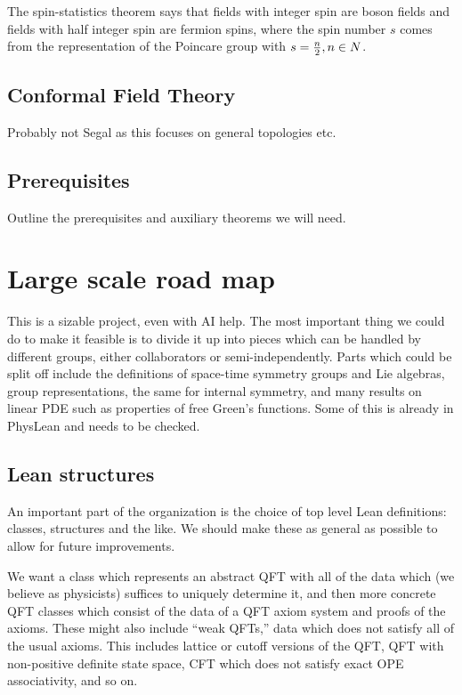 \documentclass{article}
\newcommand{\1}{\mathbbm{1}}
\theoremstyle{plain}
\theoremstyle{definition}
\numberwithin{equation}{section}
\begin{document}
The spin-statistics theorem says that fields with integer spin are boson fields and fields with half integer spin are fermion spins, where the spin number $s$ comes from the representation of the Poincare group with $s= {n \over 2}, n \in N$. 


\subsection{Conformal Field Theory}

Probably not Segal as this focuses on general topologies etc. 


\subsection{Prerequisites}
Outline the prerequisites and auxiliary theorems we will need.

\section{Large scale road map}

This is a sizable project, even with AI help.
The most important thing we could do to make it feasible is to divide it up into pieces
which can be handled by different groups, either collaborators or semi-independently.
Parts which could be split off include the definitions of space-time symmetry groups and Lie algebras,
group representations, the same for internal symmetry, and many results on linear PDE such as
properties of free Green's functions.  Some of this is already in PhysLean and needs to be checked.

\subsection{Lean structures}

An important part of the organization is the choice of top level Lean definitions: classes, structures and the like.
We should make these as general as possible to allow for future improvements.

We want a class which represents an abstract QFT with all of the data which (we believe as physicists) suffices to uniquely determine it,
and then more concrete QFT classes which consist of the data of a QFT axiom system and proofs of the axioms.  These might also include ``weak QFTs,''
data which does not satisfy all of the usual axioms.  This includes lattice or cutoff versions of the QFT, QFT with non-positive definite state space,
CFT which does not satisfy exact OPE associativity, and so on.
\end{document}
